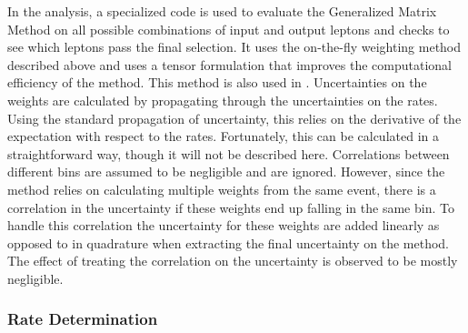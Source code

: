 In the analysis, a specialized code is used to evaluate the 
Generalized Matrix Method
on all possible combinations of input and output leptons and checks
to see which leptons pass the final selection. 
It uses the on-the-fly
weighting method described above and uses a tensor
formulation that improves the computational efficiency of the method.
This method is also used in \cite{Gillam:2014xua}.
Uncertainties on the weights are calculated by propagating through 
the uncertainties on the rates. 
Using the standard propagation of uncertainty, this relies
on the derivative of the expectation with respect to the rates.
Fortunately, this can be calculated in a straightforward way,
though it will not be described here.
Correlations between different bins are assumed to be negligible and 
are ignored.  However, since the method relies on calculating multiple
weights from the same event, there is a correlation in the uncertainty
if these weights end up falling in the same bin. To handle this 
correlation the uncertainty for these weights are added linearly 
as opposed to in quadrature when extracting the final uncertainty 
on the method. The effect of treating the correlation on the uncertainty is observed to
be mostly negligible.

\subsubsection{Rate Determination}
\label{sec:fake_and_real_rates}

